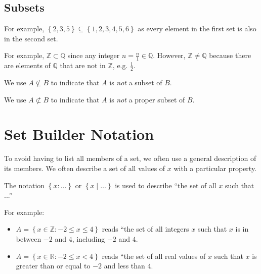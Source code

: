 \documentclass[11pt,a4paper]{book}
\newcommand{\R}{\mathbb{R}}
\newcommand{\Z}{\mathbb{Z}}
\newcommand{\Q}{\mathbb{Q}}
\begin{document}
\newpage

\subsection{Subsets}
\begin{center}
\par\end{center}

For example, $\left\{ 2,3,5\right\} \subseteq\left\{ 1,2,3,4,5,6\right\} $
as every element in the first set is also in the second set.
\begin{center}
\par\end{center}

For example, $\Z\subset\Q$ since any integer ${\displaystyle n=\frac{n}{1}\in\Q}$.
However, $\Z\neq\Q$ because there are elements of $\Q$ that are
not in $\Z$, e.g. ${\displaystyle \frac{1}{2}}$.

We use $A\not\subseteq B$ to indicate that $A$ is \textit{not} a
subset of $B$.

We use $A\not\subset B$ to indicate that $A$ is \textit{not} a proper
subset of $B$.

\section{Set Builder Notation}

To avoid having to list all members of a set, we often use a general
description of its members. We often describe a set of all values
of $x$ with a particular property.

The notation $\left\{ x:\ldots\right\} $ or $\left\{ x\mid\ldots\right\} $
is used to describe ``the set of all $x$ such that ...''

For example:
\begin{itemize}
\item $A=\left\{ x\in\Z:-2\leq x\leq4\right\} $ reads ``the set of all
integers $x$ such that $x$ is in between $-2$ and $4$, including
$-2$ and $4$.
\item $A=\left\{ x\in\R:-2\leq x<4\right\} $ reads ``the set of all real
values of $x$ such that $x$ is greater than or equal to $-2$ and
less than $4$.
\end{itemize}
\end{document}
